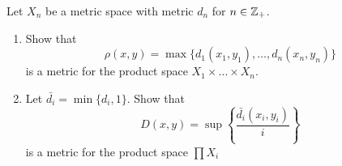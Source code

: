 \documentclass[a4paper, 12pt]{article}
\begin{document}
\begin{problem} 
    Let $X_n$ be a metric space with metric $d_n$ for $n \in \mathbb{Z}_+$. 
    \begin{enumerate}
    \item Show that \begin{equation*}
    \rho(x, y) = \max\{d_1(x_1, y_1), \ldots, d_n(x_n, y_n)\}
    \end{equation*}
    is a metric for the product space $X_1 \times \ldots \times X_n$.

    \item Let $\bar{d_i} = \min\{d_i, 1\}$. Show that \begin{equation*}
    D(x, y) = \sup\left\{\frac{\bar{d_i}(x_i, y_i)}{i}\right\}
    \end{equation*}
    is a metric for the product space $\prod X_i$
    \end{enumerate}
\end{problem}
\end{document}
